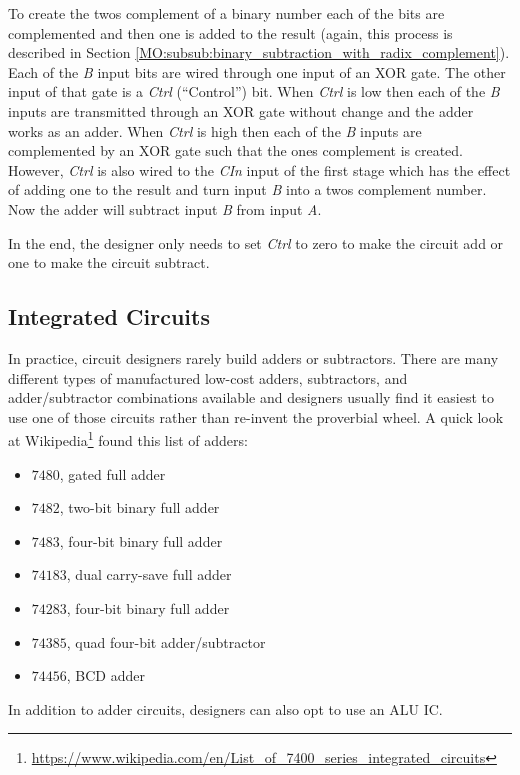 To create the twos complement of a binary number each of the bits are complemented and then one is added to the result (again, this process is described in Section \ref{MO:subsub:binary_subtraction_with_radix_complement}). Each of the \emph{B} input bits are wired through one input of an \textsf{XOR} gate. The other input of that gate is a \emph{Ctrl} (``Control'') bit. When \emph{Ctrl} is low then each of the \emph{B} inputs are transmitted through an \textsf{XOR} gate without change and the adder works as an adder. When \emph{Ctrl} is high then each of the \emph{B} inputs are complemented by an \textsf{XOR} gate such that the ones complement is created. However, \emph{Ctrl} is also wired to the \emph{CIn} input of the first stage which has the effect of adding one to the result and turn input \emph{B} into a twos complement number. Now the adder will subtract input \emph{B} from input \emph{A}.

In the end, the designer only needs to set \emph{Ctrl} to zero to make the circuit add or one to make the circuit subtract.

\subsection{Integrated Circuits}
\label{CL:subsec:adder_integrated_circuits}

In practice, circuit designers rarely build adders or subtractors. There are many different types of manufactured low-cost adders, subtractors, and adder/subtractor combinations available and designers usually find it easiest to use one of those circuits rather than re-invent the proverbial wheel. A quick look at Wikipedia\footnote{\url{https://www.wikipedia.com/en/List_of_7400_series_integrated_circuits}} found this list of adders:

\begin{itemize}
	\item $ 7480 $, gated full adder
	\item $ 7482 $, two-bit binary full adder
	\item $ 7483 $, four-bit binary full adder
	\item $ 74183 $, dual carry-save full adder
	\item $ 74283 $, four-bit binary full adder
	\item $ 74385 $, quad four-bit adder/subtractor
	\item $ 74456 $, BCD adder
\end{itemize}

In addition to adder circuits, designers can also opt to use an \ac{ALU} \ac{IC}.

